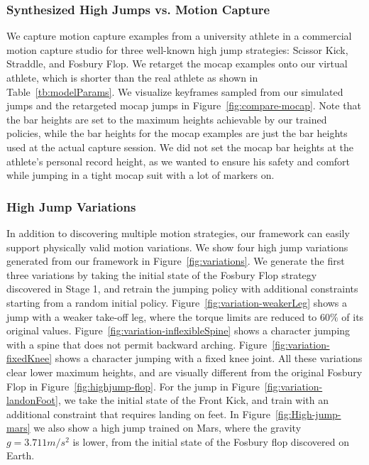 \subsubsection{Synthesized High Jumps vs. Motion Capture}
\label{sec:synthesized-mocap}
We capture motion capture examples from a university athlete in a commercial motion capture studio for three well-known high jump strategies: Scissor Kick, Straddle, and Fosbury Flop. We retarget the mocap examples onto our virtual athlete, which is shorter than the real athlete as shown in Table~\ref{tb:modelParams}. We visualize keyframes sampled from our simulated jumps and the retargeted mocap jumps in Figure~\ref{fig:compare-mocap}. Note that the bar heights are set to the maximum heights achievable by our trained policies, while the bar heights for the mocap examples are just the bar heights used at the actual capture session. We did not set the mocap bar heights at the athlete's personal record height, as we wanted to ensure his safety and comfort while jumping in a tight mocap suit with a lot of markers on.

\subsubsection{High Jump Variations}
\label{sec:synthesized-variations}

In addition to discovering multiple motion strategies, our framework can easily support physically valid motion variations. We show four high jump variations generated from our framework in Figure~\ref{fig:variations}. We generate the first three variations by taking the initial state of the Fosbury Flop strategy discovered in Stage 1, and retrain the jumping policy with additional constraints starting from  a random initial policy. Figure~\ref{fig:variation-weakerLeg} shows a jump with a weaker take-off leg, where the torque limits are reduced to $60\%$ of its original values. Figure~\ref{fig:variation-inflexibleSpine} shows a character jumping with a spine that does not permit backward arching. Figure~\ref{fig:variation-fixedKnee} shows a character jumping with a fixed knee joint. All these variations clear lower maximum heights, and are visually different from the original Fosbury Flop in Figure~\ref{fig:highjump-flop}. For the jump in Figure~\ref{fig:variation-landonFoot}, we take the initial state of the Front Kick, and train with an additional constraint that requires landing on feet. In Figure~\ref{fig:High-jump-mars} we also show a high jump trained on Mars, where the gravity $g=3.711m/s^2$ is lower, from the initial state of the Fosbury flop discovered on Earth.



 
